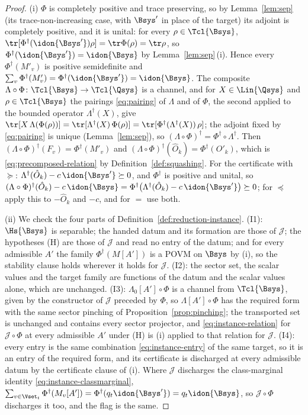 \begin{proof}
(i) $\Phi$ is completely positive and trace preserving, so by
Lemma~\ref{lem:sep} (its trace-non-increasing case, with $\Bsys'$ in place of
the target) its adjoint is completely positive, and it is unital: for every
$\rho\in\Tcl{\Bsys}$,
$\tr[\Phi^{\dagger}(\idon{\Bsys'})\rho]=\tr\Phi(\rho)=\tr\rho$, so
$\Phi^{\dagger}(\idon{\Bsys'})=\idon{\Bsys}$ by Lemma~\ref{lem:sep}\,(i).
Hence every $\Phi^{\dagger}(M'_v)$ is positive semidefinite and
$\sum_v\Phi^{\dagger}(M'_v)=\Phi^{\dagger}(\idon{\Bsys'})=\idon{\Bsys}$. The
composite $\Lambda\circ\Phi\colon\Tcl{\Bsys}\to\Tcl{\Qsys}$ is a channel, and
for $X\in\Lin{\Qsys}$ and $\rho\in\Tcl{\Bsys}$ the pairings
\eqref{eq:pairing} of $\Lambda$ and of $\Phi$, the second applied to the
bounded operator $\Lambda^{\dagger}(X)$, give
$\tr[X\,\Lambda(\Phi(\rho))]=\tr[\Lambda^{\dagger}(X)\,\Phi(\rho)]
=\tr[\Phi^{\dagger}(\Lambda^{\dagger}(X))\,\rho]$; the adjoint fixed by
\eqref{eq:pairing} is unique (Lemma~\ref{lem:sep}), so
$(\Lambda\circ\Phi)^{\dagger}=\Phi^{\dagger}\circ\Lambda^{\dagger}$. Then
$(\Lambda\circ\Phi)^{\dagger}(F_v)=\Phi^{\dagger}(M'_v)$ and
$(\Lambda\circ\Phi)^{\dagger}(\hat O_k)=\Phi^{\dagger}(O'_k)$, which is
\eqref{eq:precomposed-relation} by Definition~\ref{def:squashing}. For the
certificate with $\succeq$: $\Lambda^{\dagger}(\hat O_k)-c\,\idon{\Bsys'}
\succeq0$, and $\Phi^{\dagger}$ is positive and unital, so
$(\Lambda\circ\Phi)^{\dagger}(\hat O_k)-c\,\idon{\Bsys}
=\Phi^{\dagger}\big(\Lambda^{\dagger}(\hat O_k)-c\,\idon{\Bsys'}\big)\succeq0$;
for $\preceq$ apply this to $-\hat O_k$ and $-c$, and for $=$ use both.

(ii) We check the four parts of Definition~\ref{def:reduction-instance}.
(I1): $\Hs{\Bsys}$ is separable; the handed datum and its formation are those
of $\mathcal{J}$; the hypotheses (H) are those of $\mathcal{J}$ and read no
entry of the datum; and for every admissible $A'$ the family
$\Phi^{\dagger}(M[A'])$ is a POVM on $\Bsys$ by (i), so the stability clause
holds wherever it holds for $\mathcal{J}$. (I2): the sector set, the scalar
values and the target family are functions of the datum and the scalar
values alone, which are unchanged. (I3): $\Lambda_0[A']\circ\Phi$ is a channel
from $\Tcl{\Bsys}$, given by the constructor of $\mathcal{J}$ preceded by
$\Phi$, so $\Lambda[A']\circ\Phi$ has the required form with the same sector
pinching of Proposition~\ref{prop:pinching}; the transported set is unchanged
and contains every sector projector, and \eqref{eq:instance-relation} for
$\mathcal{J}\circ\Phi$ at every admissible $A'$ under (H) is (i) applied to
that relation for $\mathcal{J}$. (I4): every entry is the same combination
\eqref{eq:instance-entry} of the same target, so it is an entry of the
required form, and its certificate is discharged at every admissible datum by
the certificate clause of (i). Where $\mathcal{J}$ discharges the
class-marginal identity \eqref{eq:instance-classmarginal},
$\sum_{v\in\Vset_t}\Phi^{\dagger}(M_v[A'])=\Phi^{\dagger}(q_t\idon{\Bsys'})
=q_t\idon{\Bsys}$, so $\mathcal{J}\circ\Phi$ discharges it too, and the flag
is the same.


\end{proof}
